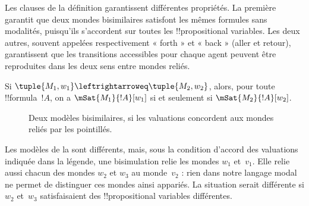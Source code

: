 \documentclass[../../../include/open-logic-section]{subfiles}
\begin{document}
Les clauses de la définition garantissent différentes propriétés.
La première garantit que deux mondes bisimilaires satisfont les mêmes
formules sans modalités, puisqu'ils s'accordent sur toutes les
!!{propositional variable}s. Les deux autres, souvent appelées
respectivement « forth » et « back » (aller et retour), garantissent
que les transitions accessibles pour chaque agent peuvent être
reproduites dans les deux sens entre mondes reliés.

\begin{thm}
Si $\tuple{M_1, w_1} \leftrightarroweq \tuple{M_2, w_2}$, alors,
pour toute !!{formula}~$!A$, on a $\mSat{M_1}{!A}[w_1]$ si et
seulement si $\mSat{M_2}{!A}[w_2]$.
\end{thm}

\begin{figure}
  \begin{center}
  \end{center}
  \caption{Deux modèles bisimilaires, si les valuations concordent
    aux mondes reliés par les pointillés.}
\end{figure}

Les modèles de la  sont différents, mais, sous
la condition d'accord des valuations indiquée dans la légende,
une bisimulation relie les mondes $w_1$ et~$v_1$. Elle relie aussi
chacun des mondes $w_2$ et $w_3$ au monde~$v_2$ : rien dans notre
langage modal ne permet de distinguer ces mondes ainsi appariés.
La situation serait différente si $w_2$ et~$w_3$ satisfaisaient
des !!{propositional variable}s différentes.
\end{document}
